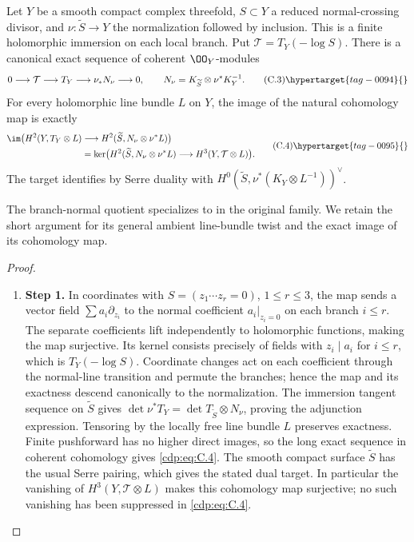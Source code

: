 \begin{proposition}\hypertarget{tag-01FR}{}\label{cdp:st:C5a}

Let $Y$ be a smooth compact complex threefold, $S\subset Y$ a reduced normal-crossing divisor, and $\nu:\widetilde S\to Y$ the normalization followed by inclusion. This is a finite holomorphic immersion on each local branch. Put $\mathcal T=T_Y(-\log S)$. There is a canonical exact sequence of coherent $\OO_Y$-modules
\[
0\longrightarrow\mathcal T\longrightarrow T_Y
 \longrightarrow\nu_*N_\nu\longrightarrow0,
\qquad N_\nu=K_{\widetilde S}\otimes\nu^*K_Y^{-1}.      \tag{C.3}\hypertarget{tag-0094}{}\label{cdp:eq:C.3}
\]
For every holomorphic line bundle $L$ on $Y$, the image of the natural cohomology map is exactly
\[
\begin{split}
\im\bigl(H^2(Y,T_Y\otimes L)&\longrightarrow
 H^2(\widetilde S,N_\nu\otimes\nu^*L)\bigr)\\
 &=\ker\bigl(H^2(\widetilde S,N_\nu\otimes\nu^*L)
 \longrightarrow H^3(Y,\mathcal T\otimes L)\bigr).
\end{split}                                             \tag{C.4}\hypertarget{tag-0095}{}\label{cdp:eq:C.4}
\]
The target identifies by Serre duality with
$H^0(\widetilde S,\nu^*(K_Y\otimes L^{-1}))^\vee$.
\end{proposition}


The branch-normal quotient specializes to \citet[Lemma~6.11, p.~81]{DGKXv1} in the original family. We retain the short argument for its general ambient line-bundle twist and the exact image of its cohomology map.

\begin{proof}
\begin{enumerate}[label={$\langle1\rangle$\arabic*.},leftmargin=*]
\item 
\noindent\textbf{Step 1.} In coordinates with $S=(z_1\cdots z_r=0)$, $1\le r\le3$, the map sends a vector field $\sum a_i\partial_{z_i}$ to the normal coefficient $a_i|_{z_i=0}$ on each branch $i\le r$. The separate coefficients lift independently to holomorphic functions, making the map surjective. Its kernel consists precisely of fields with $z_i\mid a_i$ for $i\le r$, which is $T_Y(-\log S)$. Coordinate changes act on each coefficient through the normal-line transition and permute the branches; hence the map and its exactness descend canonically to the normalization. The immersion tangent sequence on $\widetilde S$ gives $\det\nu^*T_Y=\det T_{\widetilde S}\otimes N_\nu$, proving the adjunction expression. Tensoring by the locally free line bundle $L$ preserves exactness. Finite pushforward has no higher direct images, so the long exact sequence in coherent cohomology gives \eqref{cdp:eq:C.4}. The smooth compact surface $\widetilde S$ has the usual Serre pairing, which gives the stated dual target. In particular the vanishing of $H^3(Y,\mathcal T\otimes L)$ makes this cohomology map surjective; no such vanishing has been suppressed in \eqref{cdp:eq:C.4}.

\end{enumerate}
\end{proof}